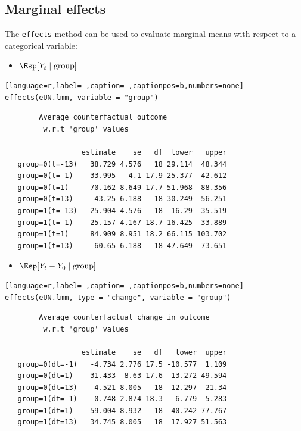 \documentclass[12pt]{article}
\begin{document}
\clearpage

\subsection{Marginal effects}
\label{sec:org053664e}

The \texttt{effects} method can be used to evaluate marginal means with
respect to a categorical variable:
\begin{itemize}
\item \(\Esp[Y_t \mid \text{group}]\)
\end{itemize}
\begin{lstlisting}[language=r,label= ,caption= ,captionpos=b,numbers=none]
effects(eUN.lmm, variable = "group")
\end{lstlisting}

\begin{verbatim}
		Average counterfactual outcome
		 w.r.t 'group' values 

                  estimate    se   df  lower   upper
   group=0(t=-13)   38.729 4.576   18 29.114  48.344
   group=0(t=-1)    33.995   4.1 17.9 25.377  42.612
   group=0(t=1)     70.162 8.649 17.7 51.968  88.356
   group=0(t=13)     43.25 6.188   18 30.249  56.251
   group=1(t=-13)   25.904 4.576   18  16.29  35.519
   group=1(t=-1)    25.157 4.167 18.7 16.425  33.889
   group=1(t=1)     84.909 8.951 18.2 66.115 103.702
   group=1(t=13)     60.65 6.188   18 47.649  73.651
\end{verbatim}

\begin{itemize}
\item \(\Esp[Y_t-Y_0 \mid \text{group}]\)
\end{itemize}
\begin{lstlisting}[language=r,label= ,caption= ,captionpos=b,numbers=none]
effects(eUN.lmm, type = "change", variable = "group")
\end{lstlisting}

\begin{verbatim}
		Average counterfactual change in outcome
		 w.r.t 'group' values 

                  estimate    se   df   lower  upper
   group=0(dt=-1)   -4.734 2.776 17.5 -10.577  1.109
   group=0(dt=1)    31.433  8.63 17.6  13.272 49.594
   group=0(dt=13)    4.521 8.005   18 -12.297  21.34
   group=1(dt=-1)   -0.748 2.874 18.3  -6.779  5.283
   group=1(dt=1)    59.004 8.932   18  40.242 77.767
   group=1(dt=13)   34.745 8.005   18  17.927 51.563
\end{verbatim}
\end{document}
